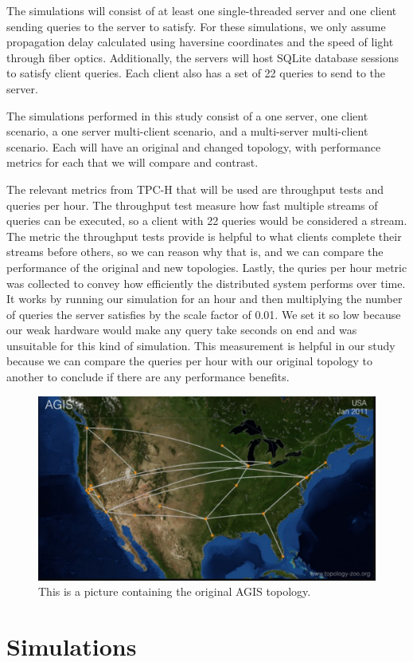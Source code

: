	The simulations will consist of at least one single-threaded server and one client sending queries to the server to satisfy. For these simulations, we only assume propagation delay calculated using haversine coordinates and the speed of light through fiber optics. Additionally, the servers will host SQLite database sessions to satisfy client queries. Each client also has a set of 22 queries to send to the server.

	The simulations performed in this study consist of a one server, one client scenario, a one server multi-client scenario, and a multi-server multi-client scenario. Each will have an original and changed topology, with performance metrics for each that we will compare and contrast.

The relevant metrics from TPC-H that will be used are throughput tests and queries per hour. The throughput test measure how fast multiple streams of queries can be executed, so a client with 22 queries would be considered a stream. The metric the throughput tests provide is helpful to what clients complete their streams before others, so we can reason why that is, and we can compare the performance of the original and new topologies. Lastly, the quries per hour metric was collected to convey how efficiently the distributed system performs over time. It works by running our simulation for an hour and then multiplying the number of queries the server satisfies by the scale factor of 0.01. We set it so low because our weak hardware would make any query take seconds on end and was unsuitable for this kind of simulation. This measurement is helpful in our study because we can compare the queries per hour with our original topology to another to conclude if there are any performance benefits.




\begin{figure}[tp]
\centering
\includegraphics[width=0.5 \textwidth]{figures/AGIS_ORIG}
\caption{This is a picture containing the original AGIS topology.
}
\end{figure}

\section{Simulations}

